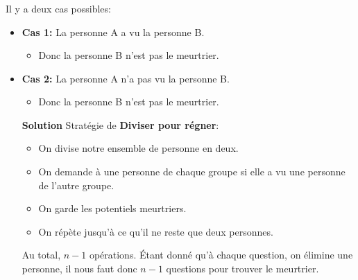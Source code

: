 \begin{frame}
    \frametitle{\problemtitle}
    Il y a deux cas possibles:
    \begin{itemize}
        \item<+-> \textbf{Cas 1:} La personne A a vu la personne B.
            \begin{itemize}
                \item Donc la personne B n'est pas le meurtrier.
            \end{itemize}
        \item<+-> \textbf{Cas 2:} La personne A n'a pas vu la personne B.
            \begin{itemize}
                \item Donc la personne B n'est pas le meurtrier.
            \end{itemize}

        \textbf{Solution} Stratégie de \textbf{Diviser pour régner}:
        \begin{itemize}
            \item<+-> On divise notre ensemble de personne en deux.
            \item<+-> On demande à une personne de chaque groupe si elle a vu une personne de l'autre groupe.
            \item<+-> On garde les potentiels meurtriers.
            \item<+-> On répète jusqu'à ce qu'il ne reste que deux personnes.
        \end{itemize}
        Au total, $n-1$ opérations. Étant donné qu'à chaque question, on élimine une personne, il nous faut donc $n-1$ questions pour trouver le meurtrier.
    \end{itemize}
\end{frame}

